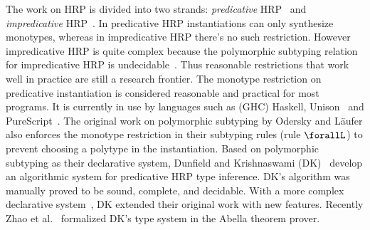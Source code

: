 The work on HRP is divided into two strands: \emph{predicative} HRP~\cite{dunfield2013complete,jones2007practical,odersky1996putting,dunfield2019sound}
and \emph{impredicative} HRP~\cite{le2003ml,leijen2008hmf,vytiniotis2008fph,Serrano2018}.
In predicative HRP instantiations can
only synthesize monotypes, whereas in impredicative HRP there's no
such restriction. However impredicative HRP is quite complex because
the polymorphic subtyping relation for impredicative HRP is undecidable~\cite{tiuryn1996subtyping}.
Thus reasonable restrictions that work well in practice are still
a research frontier.
The monotype restriction on predicative instantiation is considered reasonable
and practical for most programs. It is currently in use by languages such as
(GHC) Haskell, Unison~\cite{Unison} and PureScript~\cite{PureScript}.
The original work on polymorphic subtyping by Odersky and L\"aufer also enforces
the monotype restriction in their subtyping rules (rule $\forallL$) to prevent
choosing a polytype in the instantiation. Based on polymorphic subtyping as
their declarative system,
Dunfield and Krishnaswami (DK)~\cite{dunfield2013complete} develop an
algorithmic system for predicative HRP type inference. DK's algorithm was
manually proved to be sound, complete, and decidable.
With a more complex declarative system~\cite{dunfield2019sound}, DK
extended their original work with new features.
Recently Zhao et al.~\cite{zhao19mechanical} formalized DK's type system in the Abella
theorem prover.

\begin{comment}
\paragraph{MLSub} A recent breakthrough in the area of (global) type-inference
for type systems with subtyping is MLSub~\cite{dolan17polymorphism}. MLSub extends the Hindley-Milner
type system with support for subtyping. A key innovation
of MLSub is that it has compact principal types, which had been a challenge
in previous research on type-inference in the presence of subtyping~\cite{eifrig95inference,Trifonov96subtyping,pottier1998inference}.
MLSub is significantly more ambitious than local type-inference, and requires
no annotations (in the tradition of Hindley-Milner). However, MLSub does not
account for HRP and its algorithms and metatheory have not been mechanically
formalized.
\end{comment}

